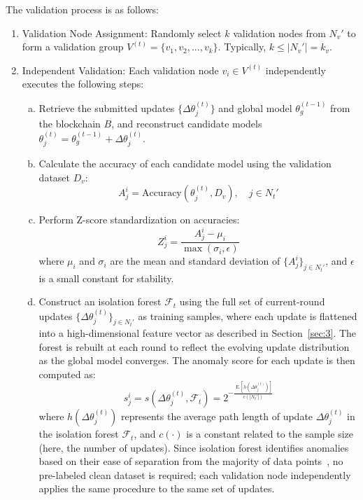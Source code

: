 \documentclass[a4paper]{cas-dc}
\begin{document}
The validation process is as follows:
\begin{enumerate}[1)]
	\item Validation Node Assignment: Randomly select $k$ validation nodes from $N_v'$ to form a validation group $V^{(t)} = \{v_1, v_2, ..., v_k\}$. Typically, $k \le |N_v'| = k_v$.
	
	\item Independent Validation: Each validation node $v_i \in V^{(t)}$ independently executes the following steps:
	\begin{enumerate}[a)]
		\item Retrieve the submitted updates $\{\Delta\theta_j^{(t)}\}$ and global model $\theta_g^{(t-1)}$ from the blockchain $B$, and reconstruct candidate models $\theta_j^{(t)}=\theta_g^{(t-1)}+\Delta\theta_j^{(t)}$.
		
		\item Calculate the accuracy of each candidate model using the validation dataset $D_v$:
		\begin{equation}
			A_j^i = \text{Accuracy}(\theta_j^{(t)}, D_v), \quad j \in N_t'
		\end{equation}
		
		\item Perform Z-score standardization on accuracies:
		\begin{equation}
			Z_j^i = \frac{A_j^i - \mu_i}{\max(\sigma_i,\epsilon)}
		\end{equation}
		where $\mu_i$ and $\sigma_i$ are the mean and standard deviation of $\{A_j^i\}_{j \in N_t'}$, and $\epsilon$ is a small constant for stability.
		
		\item Construct an isolation forest $\mathcal{F}_t$ using the full set of current-round updates $\{\Delta\theta_j^{(t)}\}_{j \in N_t'}$ as training samples, where each update is flattened into a high-dimensional feature vector as described in Section~\ref{sec:3}. The forest is rebuilt at each round to reflect the evolving update distribution as the global model converges. The anomaly score for each update is then computed as:
		\begin{equation}
			s_j^i = s(\Delta\theta_j^{(t)}, \mathcal{F}_t) = 2^{-\frac{\operatorname{E}[h(\Delta\theta_j^{(t)})]}{c(|N_t'|)}}
		\end{equation}
		where $h(\Delta\theta_j^{(t)})$ represents the average path length of update $\Delta\theta_j^{(t)}$ in the isolation forest $\mathcal{F}_t$, and $c(\cdot)$ is a constant related to the sample size (here, the number of updates). Since isolation forest identifies anomalies based on their ease of separation from the majority of data points~\cite{39}, no pre-labeled clean dataset is required; each validation node independently applies the same procedure to the same set of updates.
		

\end{enumerate}
\end{enumerate}
\end{document}
